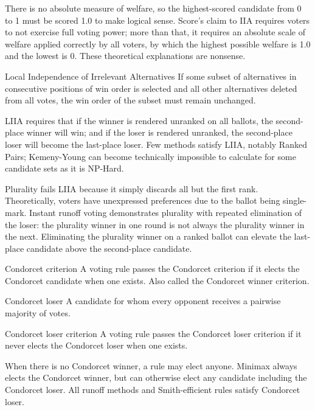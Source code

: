 There is no absolute measure of welfare, so the highest-scored candidate from 0 to 1 must be scored 1.0 to make logical sense.  Score's claim to IIA requires voters to not exercise full voting power; more than that, it requires an absolute scale of welfare applied correctly by all voters, by which the highest possible welfare is 1.0 and the lowest is 0.  These theoretical explanations are nonsense.

\begin{definition}{Local Independence of Irrelevant Alternatives}
    If some subset of alternatives in consecutive positions of win order is selected and all other alternatives deleted from all votes, the win order of the subset must remain unchanged.
\end{definition}

LIIA requires that if the winner is rendered unranked on all ballots, the second-place winner will win; and if the loser is rendered unranked, the second-place loser will become the last-place loser.  Few methods satisfy LIIA, notably Ranked Pairs; Kemeny-Young can become technically impossible to calculate for some candidate sets as it is NP-Hard.

Plurality fails LIIA because it simply discards all but the first rank.  Theoretically, voters have unexpressed preferences due to the ballot being single-mark.  Instant runoff voting demonstrates plurality with repeated elimination of the loser:  the plurality winner in one round is not always the plurality winner in the next.  Eliminating the plurality winner on a ranked ballot can elevate the last-place candidate above the second-place candidate.

\begin{definition}{Condorcet criterion}
    A voting rule passes the Condorcet criterion if it elects the Condorcet candidate when one exists.  Also called the Condorcet winner criterion.
\end{definition}

\begin{definition}{Condorcet loser}
    A candidate for whom every opponent receives a pairwise majority of votes.
\end{definition}

\begin{definition}{Condorcet loser criterion}
    A voting rule passes the Condorcet loser criterion if it never elects the Condorcet loser when one exists.
\end{definition}

When there is no Condorcet winner, a rule may elect anyone.  Minimax always elects the Condorcet winner, but can otherwise elect any candidate including the Condorcet loser.  All runoff methods and Smith-efficient rules satisfy Condorcet loser.

